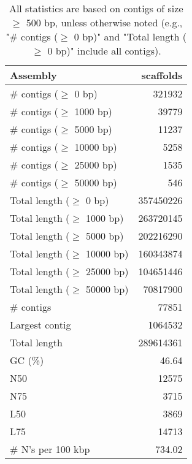 \documentclass[12pt,a4paper]{article}
\begin{document}
\begin{table}[ht]
\begin{center}
\caption{All statistics are based on contigs of size $\geq$ 500 bp, unless otherwise noted (e.g., "\# contigs ($\geq$ 0 bp)" and "Total length ($\geq$ 0 bp)" include all contigs).}
\begin{tabular}{|l*{1}{|r}|}
\hline
Assembly & scaffolds \\ \hline
\# contigs ($\geq$ 0 bp) & 321932 \\ \hline
\# contigs ($\geq$ 1000 bp) & 39779 \\ \hline
\# contigs ($\geq$ 5000 bp) & 11237 \\ \hline
\# contigs ($\geq$ 10000 bp) & 5258 \\ \hline
\# contigs ($\geq$ 25000 bp) & 1535 \\ \hline
\# contigs ($\geq$ 50000 bp) & 546 \\ \hline
Total length ($\geq$ 0 bp) & 357450226 \\ \hline
Total length ($\geq$ 1000 bp) & 263720145 \\ \hline
Total length ($\geq$ 5000 bp) & 202216290 \\ \hline
Total length ($\geq$ 10000 bp) & 160343874 \\ \hline
Total length ($\geq$ 25000 bp) & 104651446 \\ \hline
Total length ($\geq$ 50000 bp) & 70817900 \\ \hline
\# contigs & 77851 \\ \hline
Largest contig & 1064532 \\ \hline
Total length & 289614361 \\ \hline
GC (\%) & 46.64 \\ \hline
N50 & 12575 \\ \hline
N75 & 3715 \\ \hline
L50 & 3869 \\ \hline
L75 & 14713 \\ \hline
\# N's per 100 kbp & 734.02 \\ \hline
\end{tabular}
\end{center}
\end{table}
\end{document}

